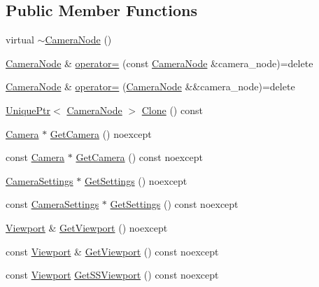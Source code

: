 \subsection*{Public Member Functions}
\begin{DoxyCompactItemize}
\item 
virtual \hyperlink{classmage_1_1_camera_node_ac6612668e7b9f829e371794d422d357f}{$\sim$\+Camera\+Node} ()
\item 
\hyperlink{classmage_1_1_camera_node}{Camera\+Node} \& \hyperlink{classmage_1_1_camera_node_a03442d51e4279717f6692e0a731967a1}{operator=} (const \hyperlink{classmage_1_1_camera_node}{Camera\+Node} \&camera\+\_\+node)=delete
\item 
\hyperlink{classmage_1_1_camera_node}{Camera\+Node} \& \hyperlink{classmage_1_1_camera_node_a8da019549eeac6c4d7d6d7c4017dd498}{operator=} (\hyperlink{classmage_1_1_camera_node}{Camera\+Node} \&\&camera\+\_\+node)=delete
\item 
\hyperlink{namespacemage_a3316d7143a973e37adf1110f2e80ca31}{Unique\+Ptr}$<$ \hyperlink{classmage_1_1_camera_node}{Camera\+Node} $>$ \hyperlink{classmage_1_1_camera_node_a6c636830efadf9753f2f0d012153d61f}{Clone} () const
\item 
\hyperlink{classmage_1_1_camera}{Camera} $\ast$ \hyperlink{classmage_1_1_camera_node_aa9887e3bf192d6c078aae2430732cbf8}{Get\+Camera} () noexcept
\item 
const \hyperlink{classmage_1_1_camera}{Camera} $\ast$ \hyperlink{classmage_1_1_camera_node_aa911263cfce8cec2a42c6d03d25af606}{Get\+Camera} () const noexcept
\item 
\hyperlink{classmage_1_1_camera_settings}{Camera\+Settings} $\ast$ \hyperlink{classmage_1_1_camera_node_a0bd616c44db36301845b02a03f1db5ba}{Get\+Settings} () noexcept
\item 
const \hyperlink{classmage_1_1_camera_settings}{Camera\+Settings} $\ast$ \hyperlink{classmage_1_1_camera_node_a1098f7929715018978b1bb8ac00c7148}{Get\+Settings} () const noexcept
\item 
\hyperlink{classmage_1_1_viewport}{Viewport} \& \hyperlink{classmage_1_1_camera_node_ac280168901be6f8bdf03300f0b8c1a69}{Get\+Viewport} () noexcept
\item 
const \hyperlink{classmage_1_1_viewport}{Viewport} \& \hyperlink{classmage_1_1_camera_node_a09a761526f36b9547d29917835e907d6}{Get\+Viewport} () const noexcept
\item 
const \hyperlink{classmage_1_1_viewport}{Viewport} \hyperlink{classmage_1_1_camera_node_a1280c0c2735869d8703b67322f13b3cc}{Get\+S\+S\+Viewport} () const noexcept
\end{DoxyCompactItemize}
